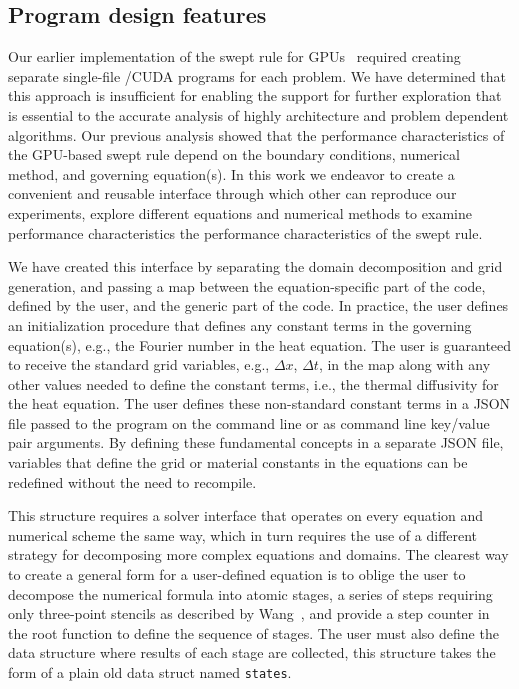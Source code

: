 \subsection{Program design features} \label{sec:ProgDesign}

Our earlier implementation of the swept rule for GPUs~\cite{OurJCP} required creating separate single-file
\CC{}\slash CUDA programs for each problem.
We have determined that this approach is insufficient for enabling the support for further exploration that is essential to the accurate analysis of highly architecture
and problem dependent algorithms.
Our previous analysis showed that the performance characteristics of the GPU-based swept rule depend
on the boundary conditions, numerical method, and governing equation(s).
In this work we endeavor to create a convenient and reusable interface through which other can reproduce our experiments, explore different equations and numerical methods to examine performance characteristics the performance characteristics of the swept rule.

We have created this interface by separating the domain decomposition and grid generation, and passing
a map between the equation-specific part of the code, defined by the user, and the generic part of the code.
In practice, the user defines an initialization procedure that defines any constant terms in the
governing equation(s), e.g., the Fourier number in the heat equation.
The user is guaranteed to receive the standard grid variables, e.g., $\Delta x$, $\Delta t$, in the map
along with any other values needed to define the constant terms, i.e., the thermal diffusivity
for the heat equation.
The user defines these non-standard constant terms in a JSON file passed to the program on the command line
or as command line key/value pair arguments. By defining these fundamental concepts in a separate JSON
file, variables that define the grid or material constants in the equations can be redefined without
the need to recompile.

This structure requires a solver interface that operates on every equation and numerical scheme
the same way, which in turn requires the use of a different strategy for decomposing more complex
equations and domains.
The clearest way to create a general form for a user-defined equation is to oblige the user to decompose
the numerical formula into atomic stages, a series of steps requiring only three-point stencils as described
by Wang~\cite{WangDecomp}, and provide a step counter in the root function to define the sequence of stages.
The user must also define the data structure where results of each stage are collected, this structure takes the form of a plain old data struct named \texttt{states}.

